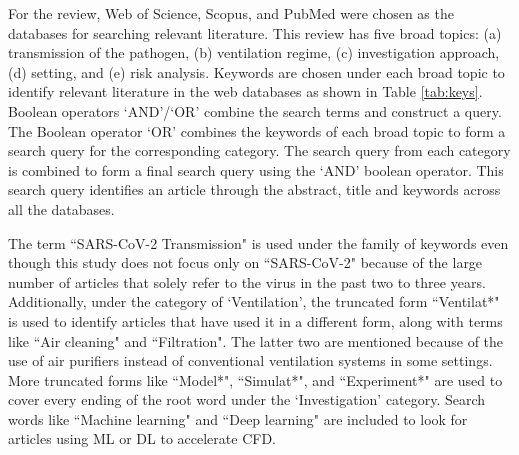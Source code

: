 \documentclass[a4paper,12pt]{elsarticle}
\begin{document}
For the review, Web of Science, Scopus, and PubMed were chosen as the databases for searching relevant literature. This review has five broad topics: (a) transmission of the pathogen, (b) ventilation regime, (c) investigation approach, (d) setting, and (e) risk analysis. Keywords are chosen under each broad topic to identify relevant literature in the web databases as shown in Table \ref{tab:keys}. Boolean operators `AND'/`OR' combine the search terms and construct a query. The Boolean operator `OR' combines the keywords of each broad topic to form a search query for the corresponding category. The search query from each category is combined to form a final search query using the `AND' boolean operator. This search query identifies an article through the abstract, title and keywords across all the databases.

The term ``SARS-CoV-2 Transmission" is used under the family of keywords even though this study does not focus only on ``SARS-CoV-2" because of the large number of articles that solely refer to the virus in the past two to three years. Additionally, under the category of `Ventilation', the truncated form ``Ventilat*" is used to identify articles that have used it in a different form, along with terms like ``Air cleaning" and ``Filtration". The latter two are mentioned because of the use of air purifiers instead of conventional ventilation systems in some settings. More truncated forms like ``Model*", ``Simulat*", and ``Experiment*" are used to cover every ending of the root word under the `Investigation' category. Search words like ``Machine learning" and ``Deep learning" are included to look for articles using ML or DL to accelerate CFD.
\end{document}
